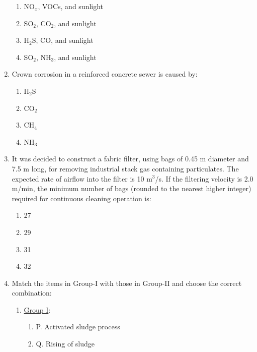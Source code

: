 \documentclass[journal]{IEEEtran}
\begin{document}
\begin{enumerate}
        \begin{enumerate}
            \item  NO$_x$, VOCs, and sunlight
            \item  SO$_2$, CO$_2$, and sunlight
            \item  H$_2$S, CO, and sunlight
            \item  SO$_2$, NH$_3$, and sunlight
        \end{enumerate}
    \item Crown corrosion in a reinforced concrete sewer is caused by:
    \begin{multicols}{4}
        \begin{enumerate}
            \item  H$_2$S
            \item  CO$_2$
            \item  CH$_4$
            \item  NH$_3$
        \end{enumerate}
            \end{multicols}
    \item It was decided to construct a fabric filter, using bags of 0.45 m diameter and 7.5 m long, for removing industrial stack gas containing particulates. The expected rate of airflow into the filter is 10 m$^3$/s. If the filtering velocity is 2.0 m/min, the minimum number of bags (rounded to the nearest higher integer) required for continuous cleaning operation is:
    \begin{multicols}{4}
        \begin{enumerate}
            \item  27
            \item  29
            \item  31
            \item  32
        \end{enumerate}
            \end{multicols}
    \item Match the items in Group-I with those in Group-II and choose the correct combination:
    \begin{multicols}{2}
        \begin{enumerate}
            \item \underline{Group I}:
                \begin{enumerate}
                    \item P. Activated sludge process
                    \item Q. Rising of sludge

\end{enumerate}
\end{enumerate}
\end{multicols}
\end{enumerate}
\end{document}
